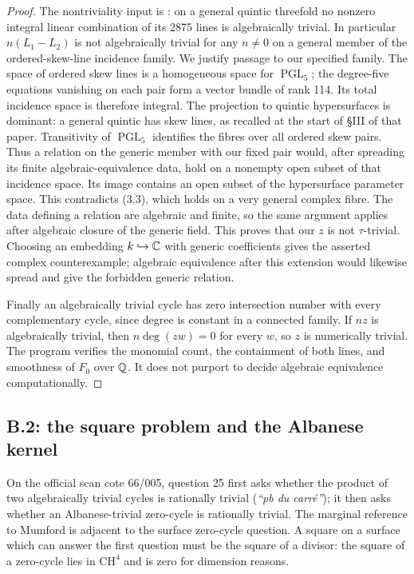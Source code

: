 \begin{proof}
The nontriviality input is \cite[\S III, assertion (3.3), p.~290]{BCeresaCollino1983}:
on a general quintic threefold no nonzero integral linear combination
of its 2875 lines is algebraically trivial. In particular
$n(L_1-L_2)$ is not algebraically trivial for any $n\ne0$ on a general
member of the ordered-skew-line incidence family. We justify passage
to our specified family. The space of ordered skew lines is a
homogeneous space for $\operatorname{PGL}_5$; the degree-five equations
vanishing on each pair form a vector bundle of rank 114. Its total
incidence space is therefore integral. The projection to quintic
hypersurfaces is dominant: a general quintic has skew lines, as recalled
at the start of \S III of that paper. Transitivity of
$\operatorname{PGL}_5$ identifies the fibres over all ordered skew pairs.
Thus a relation on the generic member with our fixed pair would, after
spreading its finite algebraic-equivalence data, hold on a nonempty
open subset of that incidence space. Its image contains an open subset
of the hypersurface parameter space. This contradicts (3.3), which
holds on a very general complex fibre. The data defining a relation
are algebraic and finite, so the same argument applies after algebraic
closure of the generic field. This proves that our $z$ is not
$\tau$-trivial. Choosing an embedding $k\hookrightarrow{\ensuremath{\mathbb{C}}}$ with generic
coefficients gives the asserted complex counterexample; algebraic
equivalence after this extension would likewise spread and give the
forbidden generic relation.

Finally an algebraically trivial cycle has zero intersection number
with every complementary cycle, since degree is constant in a connected
family. If $nz$ is algebraically trivial, then
$n\deg(zw)=0$ for every $w$, so $z$ is numerically trivial.
The program  verifies the monomial
count, the containment of both lines, and smoothness of $F_0$ over ${\mathbb{Q}}$.
It does not purport to decide algebraic equivalence computationally.
\end{proof}

\subsection{B.2: the square problem and the Albanese kernel}

On the official scan cote 66/005, question 25 first asks whether the
product of two algebraically trivial cycles is rationally trivial
(\emph{``pb du carr\'e''}); it then asks whether an Albanese-trivial
zero-cycle is rationally trivial. The marginal reference to Mumford
is adjacent to the surface zero-cycle question. A square on a surface
which can answer the first question must be the square of a divisor:
the square of a zero-cycle lies in $\mathrm{CH}^4$ and is zero for
dimension reasons.


